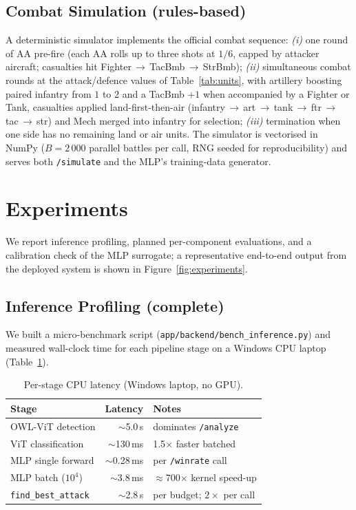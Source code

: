 \documentclass[10pt,twocolumn,letterpaper]{article}
\begin{document}
\subsection{Combat Simulation (rules-based)}
\label{sec:sim}

A deterministic simulator implements the official combat sequence:
\emph{(i)} one round of AA pre-fire (each AA rolls up to three shots
at $1/6$, capped by attacker aircraft; casualties hit
Fighter\,$\to$\,TacBmb\,$\to$\,StrBmb);
\emph{(ii)} simultaneous combat rounds at the attack/defence values
of Table~\ref{tab:units}, with artillery boosting paired infantry
from $1$ to $2$ and a TacBmb $+1$ when accompanied by a Fighter or
Tank, casualties applied land-first-then-air
(infantry\,$\to$\,art\,$\to$\,tank\,$\to$\,ftr\,$\to$\,tac\,$\to$\,str)
and Mech merged into infantry for selection;
\emph{(iii)} termination when one side has no remaining land or air
units.
The simulator is vectorised in NumPy ($B\!=\!2\,000$
parallel battles per call, RNG seeded for reproducibility) and
serves both \texttt{/simulate} and the MLP's training-data
generator.

\section{Experiments}
\label{sec:experiments}

We report inference profiling, planned per-component evaluations,
and a calibration check of the MLP surrogate; a representative
end-to-end output from the deployed system is shown in
Figure~\ref{fig:experiments}.

\subsection{Inference Profiling (complete)}
\label{sec:profiling}

We built a micro-benchmark script
(\texttt{app/backend/bench\_inference.py}) and measured wall-clock
time for each pipeline stage on a Windows CPU laptop
(Table~\ref{tab:latency}).

\begin{table}[t]
\centering
\small
\setlength{\tabcolsep}{3pt}
\caption{Per-stage CPU latency (Windows laptop, no GPU).}
\label{tab:latency}
\begin{tabular}{@{}lrl@{}}
\toprule
Stage & Latency & Notes \\
\midrule
OWL-ViT detection      & $\sim$5.0\,s   & dominates \texttt{/analyze} \\
ViT classification     & $\sim$130\,ms  & 1.5$\times$ faster batched \\
MLP single forward     & $\sim$0.28\,ms & per \texttt{/winrate} call \\
MLP batch ($10^{4}$)   & $\sim$3.8\,ms  & $\approx$700$\times$ kernel speed-up \\
\texttt{find\_best\_attack} & $\sim$2.8\,s & per budget; $2{\times}$ per call \\
\bottomrule
\end{tabular}
\end{table}
\end{document}
